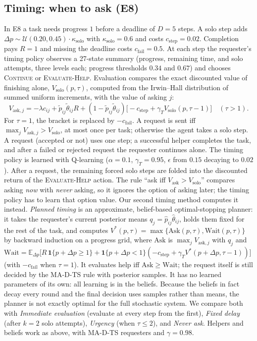 \documentclass{article}
\begin{document}
\subsection{Timing: when to ask (E8)}
In E8 a task needs progress $1$ before a deadline of $D=5$ steps. A solo step adds $\Delta p\sim\mathcal U(0.20,0.45)\cdot\kappa_{\mathrm{solo}}$ with $\kappa_{\mathrm{solo}}=0.6$ and costs $c_{\mathrm{step}}=0.02$. Completion pays $R=1$ and missing the deadline costs $c_{\mathrm{fail}}=0.5$. At each step the requester's timing policy observes a 27-state summary (progress, remaining time, and solo attempts, three levels each; progress thresholds $0.34$ and $0.67$) and chooses \textsc{Continue} or \textsc{Evaluate-Help}. Evaluation compares the exact discounted value of finishing alone, $V_{\mathrm{solo}}(p,\tau)$, computed from the Irwin--Hall distribution of summed uniform increments, with the value of asking $j$:
\begin{equation}
V_{\mathrm{ask},j}=-\lambda c_{ij}+\tilde p_{ij}\tilde\theta_{ij}R+(1-\tilde p_{ij}\tilde\theta_{ij})\big[-c_{\mathrm{step}}+\gamma_T V_{\mathrm{solo}}(p,\tau-1)\big]\quad(\tau>1).
\end{equation}
For $\tau=1$, the bracket is replaced by $-c_{\mathrm{fail}}$. A request is sent iff $\max_j V_{\mathrm{ask},j}>V_{\mathrm{solo}}$, at most once per task; otherwise the agent takes a solo step. A request (accepted or not) uses one step; a successful helper completes the task, and after a failed or rejected request the requester continues alone. The timing policy is learned with Q-learning ($\alpha=0.1$, $\gamma_T=0.95$, $\epsilon$ from $0.15$ decaying to $0.02$). After a request, the remaining forced solo steps are folded into the discounted return of the \textsc{Evaluate-Help} action. The rule ``ask iff $V_{\mathrm{ask}}>V_{\mathrm{solo}}$'' compares asking \emph{now} with \emph{never} asking, so it ignores the option of asking later; the timing policy has to learn that option value. Our second timing method computes it instead. \emph{Planned timing} is an approximate, belief-based optimal-stopping planner: it takes the requester's current posterior means $q_j=\hat p_{ij}\hat\theta_{ij}$, holds them fixed for the rest of the task, and computes $V^*(p,\tau)=\max\{\mathrm{Ask}(p,\tau),\mathrm{Wait}(p,\tau)\}$ by backward induction on a progress grid, where $\mathrm{Ask}$ is $\max_j V_{\mathrm{ask},j}$ with $q_j$ and $\mathrm{Wait}=\mathbb E_{\Delta p}\big[R\,\mathbf 1\{p+\Delta p\ge1\}+\mathbf 1\{p+\Delta p<1\}(-c_{\mathrm{step}}+\gamma_T V^*(p+\Delta p,\tau-1))\big]$ (with $-c_{\mathrm{fail}}$ when $\tau=1$). It evaluates help iff $\mathrm{Ask}\ge\mathrm{Wait}$; the request itself is still decided by the MA-D-TS rule with posterior samples. It has no learned parameters of its own: all learning is in the beliefs. Because the beliefs in fact decay every round and the final decision uses samples rather than means, the planner is not exactly optimal for the full stochastic system. We compare both with \emph{Immediate evaluation} (evaluate at every step from the first), \emph{Fixed delay} (after $k=2$ solo attempts), \emph{Urgency} (when $\tau\le2$), and \emph{Never ask}. Helpers and beliefs work as above, with MA-D-TS requesters and $\gamma=0.98$.
\end{document}
